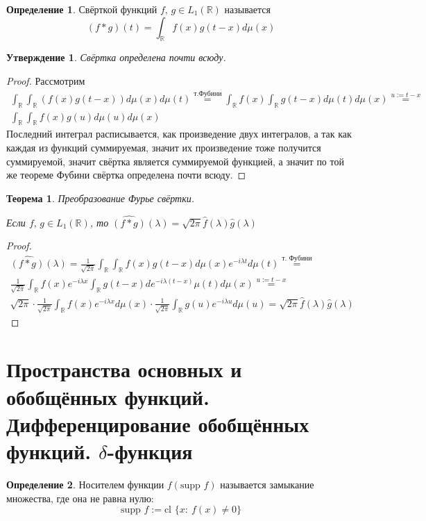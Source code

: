 \documentclass[a4paper,12pt]{article}
\theoremstyle{plain}
\newtheorem{theorem}{Теорема}[section]
\newtheorem{proposition}{Утверждение}[section]
\theoremstyle{definition}
\newtheorem{definition}{Определение}[section]
\theoremstyle{remark}
\begin{document}
\begin{definition}
	Свёрткой функций $f,\, g \in L_1(\mathbb{R})$ называется
	\[(f * g)(t) = \int_\mathbb{R}f(x)g(t - x)d\mu(x)\]
\end{definition}

\begin{proposition}
	Свёртка определена почти всюду.
\end{proposition}
\begin{proof}
	Рассмотрим 
	\begin{align*}
		\int_\mathbb{R}\int_\mathbb{R} (f(x)g(t - x))d\mu(x)d\mu(t) \stackrel{\text{т.Фубини}}{=} \int_\mathbb{R}f(x)\int_\mathbb{R}g(t - x)d\mu(t)d\mu(x) \stackrel{u := t - x}{=} \\
		\int_\mathbb{R}\int_\mathbb{R} f(x)g(u)d\mu(u)d\mu(x)
	\end{align*}
	Последний интеграл расписывается, как произведение двух интегралов, а так как каждая из функций суммируемая, значит их произведение тоже получится суммируемой, значит свёртка является суммируемой функцией, а значит по той же теореме Фубини свёртка определена почти всюду.
\end{proof}

\begin{theorem}
	Преобразование Фурье свёртки.

	Если $f,\,g \in L_1(\mathbb{R})$, то $\widehat{(f * g)}(\lambda) = \sqrt{2\pi}\hat{f}(\lambda)\hat{g}(\lambda)$
\end{theorem}
\begin{proof}
	\begin{align*}
		\widehat{(f * g)}(\lambda) = \frac{1}{\sqrt{2\pi}}\int_\mathbb{R}\int_\mathbb{R} f(x)g(t - x)d\mu(x)e^{-i\lambda t}d\mu(t) \stackrel{\text{т. Фубини}}{=}\\
		\frac{1}{\sqrt{2\pi}}\int_\mathbb{R}f(x) e^{-i\lambda x}\int_\mathbb{R}g(t - x)d e^{-i\lambda (t - x)}\mu(t)d\mu(x) \stackrel{u := t - x}{=} \\
		\sqrt{2\pi}\cdot\frac{1}{\sqrt{2\pi}}\int_\mathbb{R}f(x) e^{-i\lambda x} d\mu(x) \cdot \frac{1}{\sqrt{2\pi}}\int_\mathbb{R}g(u) e^{-i\lambda u} d\mu(u) = \sqrt{2\pi}\hat{f}(\lambda)\hat{g}(\lambda)
	\end{align*}
\end{proof}

\section{Пространства основных и обобщённых функций. Дифференцирование обобщённых функций. $\delta$-функция}
\begin{definition}
	Носителем функции $f (\text{supp }f)$ называется замыкание множества, где она не равна нулю:
	\[\text{supp }f := \text{cl }\{x:\: f(x) \neq 0\}\]
\end{definition}
\end{document}
